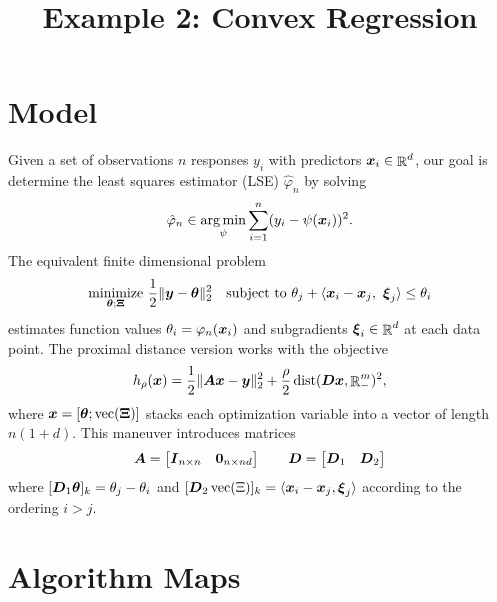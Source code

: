 \documentclass{article}
\title{Example 2: Convex Regression}
\author{}
\date{}
\begin{document}
\maketitle

\section*{\center Model}

Given a set of observations $n$ responses \(y_{i}\) with predictors $\boldsymbol{x}_{i} \in \mathop{\mathbb{R}}\nolimits^{d}$, our goal is determine the least squares estimator (LSE) \(\hat{\varphi}_{n}\) by solving
\begin{equation*}
    \hat{\varphi}_{n} \in \underset{\psi}{\arg \min}
    \sum_{i=1}^{n} (y_{i} - \psi(\boldsymbol{x}_{i}))^{2}.
\end{equation*}
The equivalent finite dimensional problem
\begin{equation*}
    \underset{\boldsymbol{\theta}; \boldsymbol{\Xi}}{\mathrm{minimize}}
    ~\frac{1}{2} \|\boldsymbol{y} - \boldsymbol{\theta}\|_{2}^{2}
    \quad
    \text{subject to}
    ~\theta_{j} + \langle{\boldsymbol{x}_{i} - \boldsymbol{x}_{j},~\boldsymbol{\xi}_{j}}\rangle \le \theta_{i}
\end{equation*}
estimates function values \(\theta_{i} = \varphi_{n}(\boldsymbol{x}_{i})\) and subgradients \(\boldsymbol{\xi}_{i} \in \mathop{\mathbb{R}}\nolimits^{d}\) at each data point.
The proximal distance version works with the objective
\begin{equation*}
    h_{\rho}(\boldsymbol{x})
    =
    \frac{1}{2} \|\boldsymbol{A} \boldsymbol{x} - \boldsymbol{y}\|^{2}_{2}
    + \frac{\rho}{2} \mathop{\rm dist}\nolimits(\boldsymbol{D} \boldsymbol{x}, \mathop{\mathbb{R}}\nolimits_{-}^{m})^{2},
\end{equation*}
where $\boldsymbol{x} = [\boldsymbol{\theta}; \mathop{\rm vec}\nolimits(\boldsymbol{\Xi})]$ stacks each optimization variable into a vector of length $n(1+d)$.
This maneuver introduces matrices
\begin{equation*}
    \boldsymbol{A} = \begin{bmatrix}
        \boldsymbol{I}_{n \times n} & \boldsymbol{0}_{n \times nd}
    \end{bmatrix}
    \qquad
    \boldsymbol{D} = \begin{bmatrix}
        \boldsymbol{D}_{1} & \boldsymbol{D}_{2}
    \end{bmatrix}
\end{equation*}
where $[\boldsymbol{D}_{1} \boldsymbol{\theta}]_{k} = \theta_{j} - \theta_{i}$ and $[\boldsymbol{D}_{2} \mathop{\rm vec}\nolimits(\Xi)]_{k} = \langle{\boldsymbol{x}_{i} - \boldsymbol{x}_{j}, \boldsymbol{\xi}_{j}}\rangle$ according to the ordering $i > j$.

\section*{\center Algorithm Maps}
\end{document}
